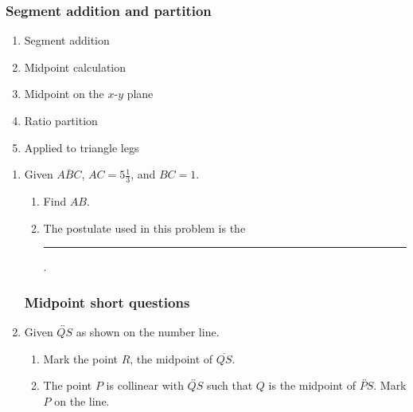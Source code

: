 \documentclass[12pt, oneside]{article}
\begin{document}
\subsubsection*{Segment addition and partition}
\begin{enumerate}
  \item Segment addition
  \item Midpoint calculation
  \item Midpoint on the $x$-$y$ plane
  \item Ratio partition
  \item Applied to triangle legs
  \end{enumerate}

\begin{enumerate}
\subsubsection*{Segment addition short questions}
  \item Given $\overline{ABC}$, $AC=5 \frac{1}{3}$, and $BC=1$.
    \begin{enumerate}
      \item Find ${AB}$.\\[0.75cm]
         \bigskip
      \item The postulate used in this problem is the \rule{6cm}{0.15mm}.
      \end{enumerate}

\subsubsection*{Midpoint short questions}
  \item Given $\overleftrightarrow{QS}$ as shown on the number line. \\[10pt]
    \begin{enumerate}
      \item Mark the point $R$, the midpoint of $\overline{QS}$.
      \item The point $P$ is collinear with $\overleftrightarrow{QS}$ such that $Q$ is the midpoint of $\overleftrightarrow{PS}$. Mark $P$ on the line.
      \end{enumerate}



\end{enumerate}
\end{document}
